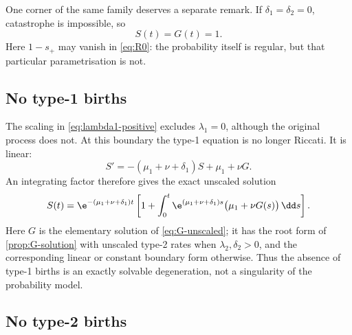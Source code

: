 One corner of the same family deserves a separate remark. If $\delta_1=\delta_2=0$, catastrophe is impossible, so
\begin{equation}
\label{eq:no-catastrophe-trivial}
S(t)=G(t)=1.
\end{equation}
Here $1-s_+$ may vanish in \cref{eq:R0}: the probability itself is regular, but that particular parametrisation is not.

\subsection{No type-1 births}
\label{sec:lambda1-zero}

The scaling in \eqref{eq:lambda1-positive} excludes $\lambda_1=0$, although the original process does not. At this boundary the type-1 equation is no longer Riccati. It is linear:
\[
S'=-(\mu_1+\nu+\delta_1)S+\mu_1+\nu G.
\]
An integrating factor therefore gives the exact unscaled solution
\begin{equation}
\label{eq:S-lambda1-zero}
S(t)=\e^{-(\mu_1+\nu+\delta_1)t}
\left[1+\int_0^t \e^{(\mu_1+\nu+\delta_1)s}
\bigl(\mu_1+\nu G(s)\bigr)\,\dd s\right].
\end{equation}
Here $G$ is the elementary solution of \cref{eq:G-unscaled}; it has the root form of \cref{prop:G-solution} with unscaled type-2 rates when $\lambda_2,\delta_2>0$, and the corresponding linear or constant boundary form otherwise. Thus the absence of type-1 births is an exactly solvable degeneration, not a singularity of the probability model.

\subsection{No type-2 births}
\label{sec:lambda2-zero}

